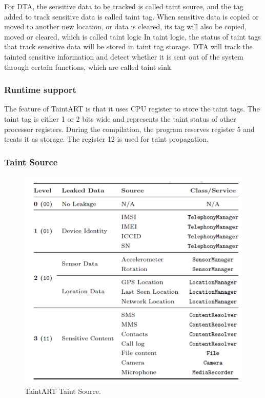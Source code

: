 \documentclass{article}
\begin{document}
For DTA, the sensitive data to be tracked is called taint source, and the tag added to track sensitive data is called taint tag. When sensitive data is copied or moved to another new location, or data is cleared, its tag will also be copied, moved or cleared, which is called taint logic In taint logic, the status of taint tags that track sensitive data will be stored in taint tag storage. DTA will track the tainted sensitive information and detect whether it is sent out of the system through certain functions, which are called taint sink.

\subsubsection{Runtime support}
The feature of TaintART is that it uses CPU register to store the taint tags. The taint tag is either 1 or 2 bits wide and represents the taint status of other processor registers. During the compilation, the program reserves register 5 and treats it as storage. The register 12 is used for taint propagation.


\subsubsection{Taint Source}
\begin{figure}[ht]
  \centering
  \includegraphics[scale=0.3]{TaintART2.png}
  \caption{TaintART Taint Source.}
  \label{fig:TaintART2}
\end{figure}
\end{document}
